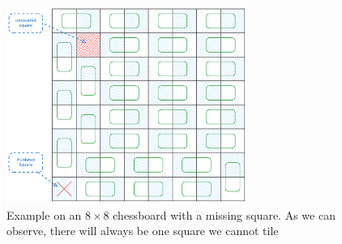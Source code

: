 \begin{figure}[h!]
    \centering
    \includegraphics[width=0.7\textwidth]{Chapter2/1-mc-example.pdf}
    \caption{Example on an $8 \times 8$ chessboard with a missing square. As we can observe, there will always be one square we cannot tile }
    \label{fig:chap-2:1-mc-example}
\end{figure}








